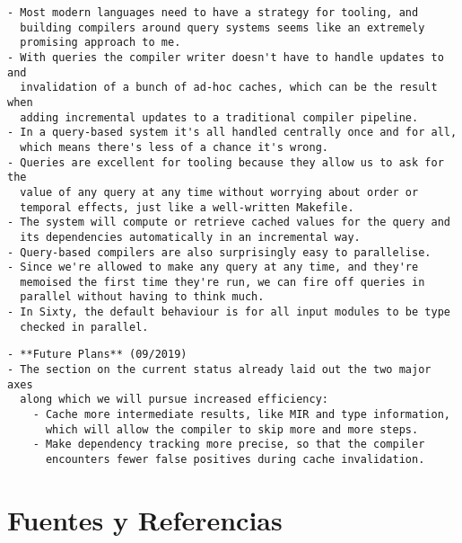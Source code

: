 \documentclass[12pt, a4paper]{report}
\begin{document}
\begin{verbatim}
- Most modern languages need to have a strategy for tooling, and
  building compilers around query systems seems like an extremely
  promising approach to me.
- With queries the compiler writer doesn't have to handle updates to and
  invalidation of a bunch of ad-hoc caches, which can be the result when
  adding incremental updates to a traditional compiler pipeline.
- In a query-based system it's all handled centrally once and for all,
  which means there's less of a chance it's wrong.
- Queries are excellent for tooling because they allow us to ask for the
  value of any query at any time without worrying about order or
  temporal effects, just like a well-written Makefile.
- The system will compute or retrieve cached values for the query and
  its dependencies automatically in an incremental way.
- Query-based compilers are also surprisingly easy to parallelise.
- Since we're allowed to make any query at any time, and they're
  memoised the first time they're run, we can fire off queries in
  parallel without having to think much.
- In Sixty, the default behaviour is for all input modules to be type
  checked in parallel.
\end{verbatim}

\begin{verbatim}
- **Future Plans** (09/2019)
- The section on the current status already laid out the two major axes
  along which we will pursue increased efficiency:
	- Cache more intermediate results, like MIR and type information,
	  which will allow the compiler to skip more and more steps.
	- Make dependency tracking more precise, so that the compiler
	  encounters fewer false positives during cache invalidation.
\end{verbatim}

\section*{Fuentes y Referencias}
\end{document}
